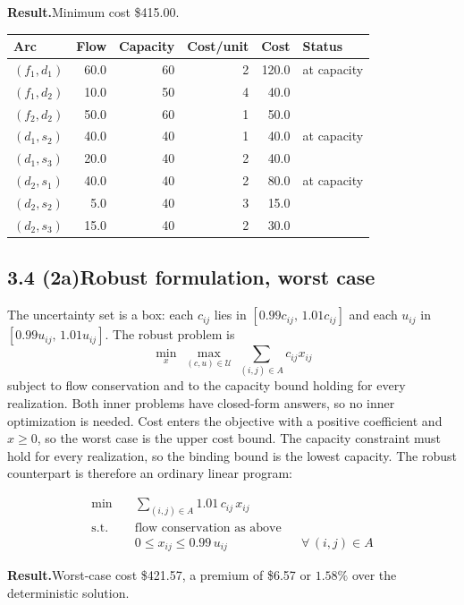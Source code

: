 \documentclass[11pt]{article}
\DeclareMathOperator*{\minimize}{min}
\begin{document}
\textbf{Result.}\quad Minimum cost \$415.00.

\begin{center}
\begin{tabular}{@{}lrrrrl@{}}
\toprule
Arc & Flow & Capacity & Cost/unit & Cost & Status \\
\midrule
$(f_1, d_1)$ & 60.0 & 60 & 2 & 120.0 & at capacity \\
$(f_1, d_2)$ & 10.0 & 50 & 4 &  40.0 & \\
$(f_2, d_2)$ & 50.0 & 60 & 1 &  50.0 & \\
$(d_1, s_2)$ & 40.0 & 40 & 1 &  40.0 & at capacity \\
$(d_1, s_3)$ & 20.0 & 40 & 2 &  40.0 & \\
$(d_2, s_1)$ & 40.0 & 40 & 2 &  80.0 & at capacity \\
$(d_2, s_2)$ &  5.0 & 40 & 3 &  15.0 & \\
$(d_2, s_3)$ & 15.0 & 40 & 2 &  30.0 & \\
\bottomrule
\end{tabular}
\end{center}

\subsection*{3.4 (2a)\quad Robust formulation, worst case}

The uncertainty set is a box: each $c_{ij}$ lies in
$[0.99 c_{ij},\, 1.01 c_{ij}]$ and each $u_{ij}$ in
$[0.99 u_{ij},\, 1.01 u_{ij}]$. The robust problem is
\[
  \min_{x} \ \max_{(c,u) \in \mathcal{U}} \ \sum_{(i,j) \in A} c_{ij} x_{ij}
\]
subject to flow conservation and to the capacity bound holding for every
realization. Both inner problems have closed-form answers, so no inner
optimization is needed. Cost enters the objective with a positive
coefficient and $x \ge 0$, so the worst case is the upper cost bound.
The capacity constraint must hold for every realization, so the binding
bound is the lowest capacity. The robust counterpart is therefore an
ordinary linear program:

\begin{align}
  \minimize \quad & \sum_{(i,j) \in A} 1.01\, c_{ij}\, x_{ij} \\[2pt]
  \text{s.t.} \quad & \text{flow conservation as above} \\[2pt]
    & 0 \le x_{ij} \le 0.99\, u_{ij} && \forall\, (i,j) \in A
\end{align}

\textbf{Result.}\quad Worst-case cost \$421.57, a premium of \$6.57 or
$1.58\%$ over the deterministic solution.
\end{document}
